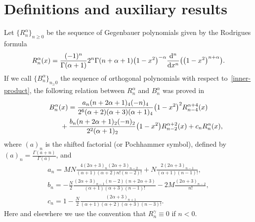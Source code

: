 \section{Definitions and auxiliary results}\label{section2}

Let $\{R_n^{\alpha}\}_{n\ge 0}$ be the sequence of Gegenbauer polynomials given by the Rodrigues formula
\begin{gather*}
R_n^{\alpha}(x)=\frac{(-1)^n}{\Gamma(\alpha+1)}{2^n\Gamma(n+\alpha+1)}\big(1-x^2\big)^{-\alpha} \frac{{\rm d}^n}{{\rm d}x^n}\big(\big(1-x^2\big)^{n+\alpha}\big).
\end{gather*}
If we call $\{B_n^{\alpha}\}_{n_\ge 0}$ the sequence of orthogonal polynomials with respect to~\eqref{inner-product}, the following relation between $R_n^{\alpha}$ and $B_n^{\alpha}$ was proved in \cite{bavinck}
\begin{gather}
B_n^{\alpha}(x)=\frac{a_n(n+2\alpha+1)_4(-n)_4}{2^6(\alpha+2)(\alpha+3)(\alpha+1)_4}\big(1-x^2\big)^2R_{n-4}^{\alpha+4}(x)\nonumber\\
\hphantom{B_n^{\alpha}(x)=}{} +\frac{b_n(n+2\alpha+1)_2(-n)_2}{2^2(\alpha+1)_2}\big(1-x^2\big)R_{n-2}^{\alpha+2}(x)+c_nR_n^{\alpha}(x),\label{rel-ortogonal}
\end{gather}
where $(a)_n$ is the shifted factorial (or Pochhammer symbol), defined by $(a)_n=\frac{\Gamma(a+n)}{\Gamma(a)}$, and
\begin{gather*}
a_n=MN\frac{4(2\alpha+3)_n(2\alpha+3)_{n-2}}{(\alpha+1)(\alpha+2)n!(n-2)!}+N\frac{2(2\alpha+3)_{n-1}}{(\alpha+1)(n-1)!},\\
b_n =-\frac{N}{2}\frac{(2\alpha+3)_{n-1}(n-2)(n+2\alpha+3)}{(\alpha+1)(\alpha+3)(n-1)!}-2M\frac{(2\alpha+3)_{n-2}}{n!},\\
c_n=1-\frac{N}{2}\frac{(2\alpha+3)_{n+1}}{(\alpha+1)(\alpha+2)(\alpha+3)(n-3)!}.
\end{gather*}
Here and elsewhere we use the convention that $R_n^{\gamma}\equiv 0$ if $n<0$.

